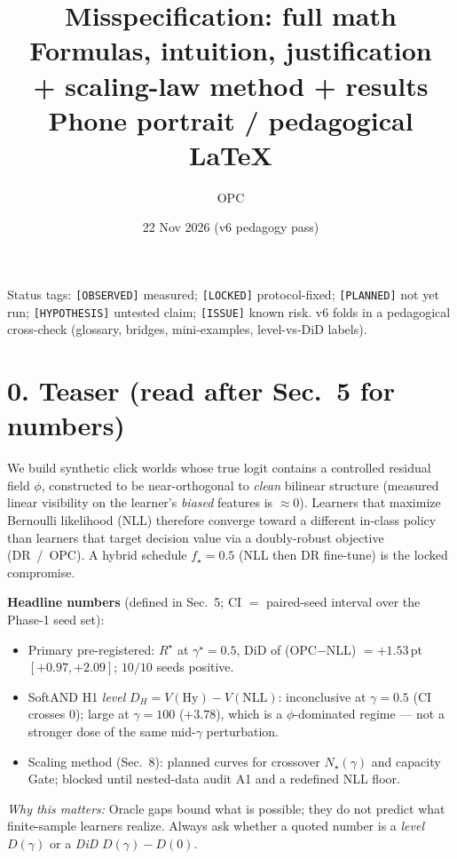 \documentclass[11pt]{article}
\title{\textbf{Misspecification: full math}\\[0.2em]
\large Formulas, intuition, justification\\[0.1em]
+ scaling-law method + results\\[0.15em]
\normalsize Phone portrait / pedagogical \LaTeX}
\author{OPC}
\date{22 Nov 2026 (v6 pedagogy pass)}
\newcommand{\phonesection}[1]{\Needspace{8\baselineskip}\section*{#1}}
\newcommand{\stag}[1]{\texttt{[#1]}}
\newcommand{\Rstar}{R^{\star}}
\newcommand{\why}[1]{\par{\footnotesize\color{blue!35!black}\textit{Why this matters:} #1\par}}
\begin{document}
\maketitle

{\footnotesize\raggedright
Status tags: \stag{OBSERVED} measured;
\stag{LOCKED} protocol-fixed;
\stag{PLANNED} not yet run;
\stag{HYPOTHESIS} untested claim;
\stag{ISSUE} known risk.
v6 folds in a pedagogical cross-check
(glossary, bridges, mini-examples,
level-vs-DiD labels).\par
}

\phonesection{0. Teaser (read after Sec.~5 for numbers)}

We build synthetic click worlds whose true logit
contains a controlled residual field $\phi$,
constructed to be near-orthogonal to
\emph{clean} bilinear structure (measured
linear visibility on the learner's
\emph{biased} features is $\approx 0$).
Learners that maximize Bernoulli likelihood
(NLL) therefore converge toward a different
in-class policy than learners that target
decision value via a doubly-robust objective
(DR~/~OPC).  A hybrid schedule
$f_{\star}{=}0.5$ (NLL then DR fine-tune) is
the locked compromise.

\textbf{Headline numbers} (defined in
Sec.~5; CI $=$ paired-seed interval over
the Phase-1 seed set):
\begin{itemize}
  \item Primary pre-registered:
        $\Rstar$ at $\gamma^{\star}{=}0.5$,
        DiD of (OPC$-$NLL)
        $=+1.53$\,pt $[+0.97,+2.09]$;
        $10/10$ seeds positive.
  \item SoftAND H1 \emph{level}
        $D_{H}=V(\mathrm{Hy})-V(\mathrm{NLL})$:
        inconclusive at $\gamma{=}0.5$
        (CI crosses 0); large at
        $\gamma{=}100$ ($+3.78$), which is a
        $\phi$-dominated regime --- not a
        stronger dose of the same mid-$\gamma$
        perturbation.
  \item Scaling method (Sec.~8): planned
        curves for crossover $N_{\star}(\gamma)$
        and capacity Gate; blocked until
        nested-data audit A1 and a redefined
        NLL floor.
\end{itemize}

\why{Oracle gaps bound what is possible;
they do not predict what finite-sample
learners realize.  Always ask whether a
quoted number is a \emph{level} $D(\gamma)$
or a \emph{DiD} $D(\gamma)-D(0)$.}
\end{document}
